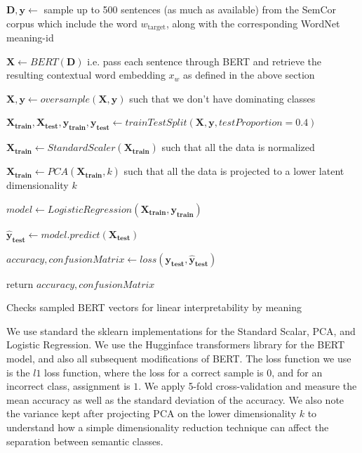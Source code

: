 \documentclass[a4paper,12pt,oneside,openright]{report}
\begin{document}
\begin{algorithm}[H]
\SetAlgoLined
{}
 $\mathbf{D}, \mathbf{y} \leftarrow $  sample up to 500 sentences (as much as available) from the SemCor corpus which include the word $w_{\text{target}}$, along with the corresponding WordNet meaning-id\;

$ \mathbf{X} \leftarrow BERT( \mathbf{D} )$ i.e. pass each sentence through BERT and retrieve the resulting contextual word embedding $x_w$ as defined in the above section\;
 
$ \mathbf{X}, \mathbf{y} \leftarrow oversample( \mathbf{X}, \mathbf{y} )$ such that we don't have dominating classes\;
 
$ \mathbf{X_\text{train}}, \mathbf{X_\text{test}}, \mathbf{y_\text{train}}, \mathbf{y_\text{test}} \leftarrow trainTestSplit( \mathbf{X}, \mathbf{y}, testProportion=0.4 )$ \;

$ \mathbf{X_\text{train}} \leftarrow StandardScaler( \mathbf{X_\text{train}})$ such that all the data is normalized\;

$ \mathbf{X_\text{train}} \leftarrow PCA( \mathbf{X_\text{train}}, k )$ such that all the data is projected to a lower latent dimensionality $k$\;

$ model \leftarrow LogisticRegression( \mathbf{X_\text{train}}, \mathbf{y_\text{train}} )$ \;
    
$ \mathbf{\hat{y}_\text{test}} \leftarrow model.predict(\mathbf{X_\text{test}})$ \;

$ accuracy, confusionMatrix \leftarrow loss(\mathbf{y_\text{test}}, \mathbf{\hat{y}_\text{test}}) $ \;
    
return $ accuracy, confusionMatrix $\;
    
 \caption{Checks sampled BERT vectors for linear interpretability by meaning}
 \label{alg:linear_separability}
\end{algorithm}

\hfill \break

We use standard the sklearn \cite{scikit-learn} implementations for the Standard Scalar, PCA, and Logistic Regression. 
We use the Hugginface transformers library \cite{Wolf2019} for the  BERT model, and also all subsequent modifications of BERT.
The loss function we use is the $l1$ loss function, where the loss for a correct sample is $0$, and for an incorrect class, assignment is $1$.
We apply 5-fold cross-validation and measure the mean accuracy as well as the standard deviation of the accuracy. 
We also note the variance kept after projecting PCA on the lower dimensionality $k$ to understand how a simple dimensionality reduction technique can affect the separation between semantic classes.
\end{document}
